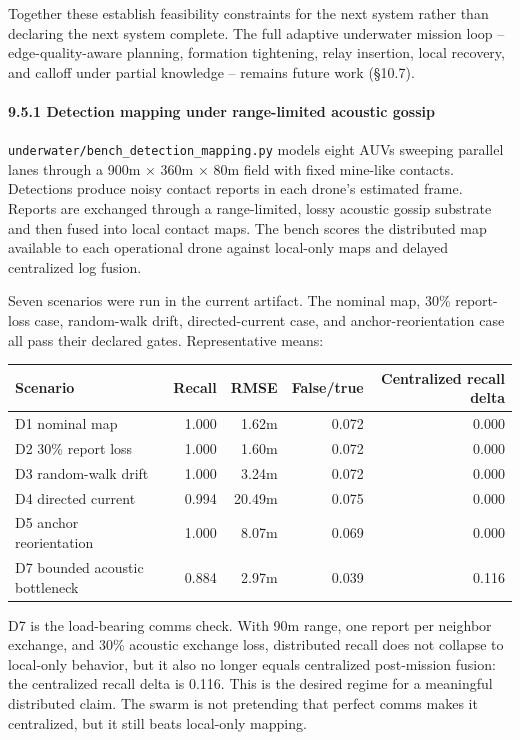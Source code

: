 Together these establish feasibility constraints for the next system
rather than declaring the next system complete. The full adaptive
underwater mission loop -- edge-quality-aware planning, formation
tightening, relay insertion, local recovery, and calloff under partial
knowledge -- remains future work (§10.7).

\paragraph{9.5.1 Detection mapping under range-limited acoustic
gossip}\label{detection-mapping-under-range-limited-acoustic-gossip}

\texttt{underwater/bench\_detection\_mapping.py} models eight AUVs
sweeping parallel lanes through a 900m × 360m × 80m field with fixed
mine-like contacts. Detections produce noisy contact reports in each
drone's estimated frame. Reports are exchanged through a range-limited,
lossy acoustic gossip substrate and then fused into local contact maps.
The bench scores the distributed map available to each operational drone
against local-only maps and delayed centralized log fusion.

Seven scenarios were run in the current artifact. The nominal map, 30\%
report-loss case, random-walk drift, directed-current case, and
anchor-reorientation case all pass their declared gates. Representative
means:

{\def\LTcaptype{none} %
\begin{longtable}[]{@{}lrrrr@{}}
\toprule\noalign{}
Scenario & Recall & RMSE & False/true & Centralized recall delta \\
\midrule\noalign{}
\endhead
\bottomrule\noalign{}
\endlastfoot
D1 nominal map & 1.000 & 1.62m & 0.072 & 0.000 \\
D2 30\% report loss & 1.000 & 1.60m & 0.072 & 0.000 \\
D3 random-walk drift & 1.000 & 3.24m & 0.072 & 0.000 \\
D4 directed current & 0.994 & 20.49m & 0.075 & 0.000 \\
D5 anchor reorientation & 1.000 & 8.07m & 0.069 & 0.000 \\
D7 bounded acoustic bottleneck & 0.884 & 2.97m & 0.039 & 0.116 \\
\end{longtable}
}

D7 is the load-bearing comms check. With 90m range, one report per
neighbor exchange, and 30\% acoustic exchange loss, distributed recall
does not collapse to local-only behavior, but it also no longer equals
centralized post-mission fusion: the centralized recall delta is 0.116.
This is the desired regime for a meaningful distributed claim. The swarm
is not pretending that perfect comms makes it centralized, but it still
beats local-only mapping.

